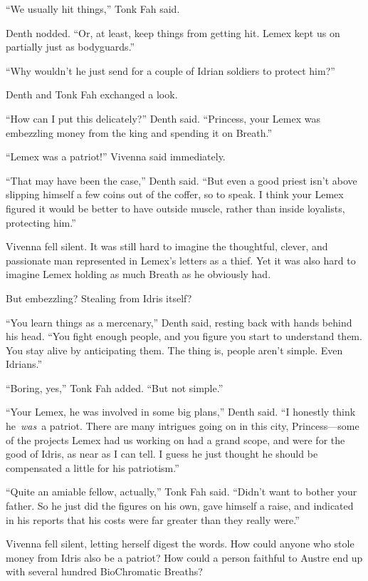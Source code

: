 “We usually hit things,” Tonk Fah said.

Denth nodded. “Or, at least, keep things from getting hit. Lemex kept us on partially just as bodyguards.”

“Why wouldn’t he just send for a couple of Idrian soldiers to protect him?”

Denth and Tonk Fah exchanged a look.

“How can I put this delicately?” Denth said. “Princess, your Lemex was embezzling money from the king and spending it on Breath.”

“Lemex was a patriot!” Vivenna said immediately.

“That may have been the case,” Denth said. “But even a good priest isn’t above slipping himself a few coins out of the coffer, so to speak. I think your Lemex figured it would be better to have outside muscle, rather than inside loyalists, protecting him.”

Vivenna fell silent. It was still hard to imagine the thoughtful, clever, and passionate man represented in Lemex’s letters as a thief. Yet it was also hard to imagine Lemex holding as much Breath as he obviously had.

But embezzling? Stealing from Idris itself?

“You learn things as a mercenary,” Denth said, resting back with hands behind his head. “You fight enough people, and you figure you start to understand them. You stay alive by anticipating them. The thing is, people aren’t simple. Even Idrians.”

“Boring, yes,” Tonk Fah added. “But not simple.”

“Your Lemex, he was involved in some big plans,” Denth said. “I honestly think he~\textit{was}~a patriot. There are many intrigues going on in this city, Princess—some of the projects Lemex had us working on had a grand scope, and were for the good of Idris, as near as I can tell. I guess he just thought he should be compensated a little for his patriotism.”

“Quite an amiable fellow, actually,” Tonk Fah said. “Didn’t want to bother your father. So he just did the figures on his own, gave himself a raise, and indicated in his reports that his costs were far greater than they really were.”

Vivenna fell silent, letting herself digest the words. How could anyone who stole money from Idris also be a patriot? How could a person faithful to Austre end up with several hundred BioChromatic Breaths?

